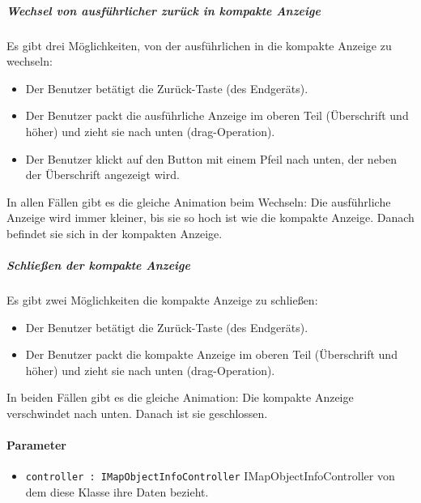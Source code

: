 \subparagraph*{Wechsel von ausführlicher zurück in kompakte Anzeige}
Es gibt drei Möglichkeiten, von der ausführlichen in die kompakte Anzeige zu wechseln:
\begin{itemize}
    \item Der Benutzer betätigt die Zurück-Taste (des Endgeräts).
    \item Der Benutzer packt die ausführliche Anzeige im oberen Teil (Überschrift und höher) und zieht sie nach unten (drag-Operation).
    \item Der Benutzer klickt auf den Button mit einem Pfeil nach unten, der neben der Überschrift angezeigt wird.
\end{itemize}
In allen Fällen gibt es die gleiche Animation beim Wechseln: Die ausführliche Anzeige wird immer 
kleiner, bis sie so hoch ist wie die kompakte Anzeige. Danach befindet sie sich in der kompakten Anzeige.

\subparagraph*{Schließen der kompakte Anzeige}
Es gibt zwei Möglichkeiten die kompakte Anzeige zu schließen:
\begin{itemize}
    \item Der Benutzer betätigt die Zurück-Taste (des Endgeräts).
    \item Der Benutzer packt die kompakte Anzeige im oberen Teil (Überschrift und höher) und zieht sie nach unten (drag-Operation). 
\end{itemize}
In beiden Fällen gibt es die gleiche Animation: Die kompakte Anzeige verschwindet nach unten. Danach ist sie geschlossen.

\paragraph*{Parameter}
\begin{itemize}
    \item \texttt{controller : IMapObjectInfoController} IMapObjectInfoController von dem diese Klasse ihre Daten bezieht.
\end{itemize}
